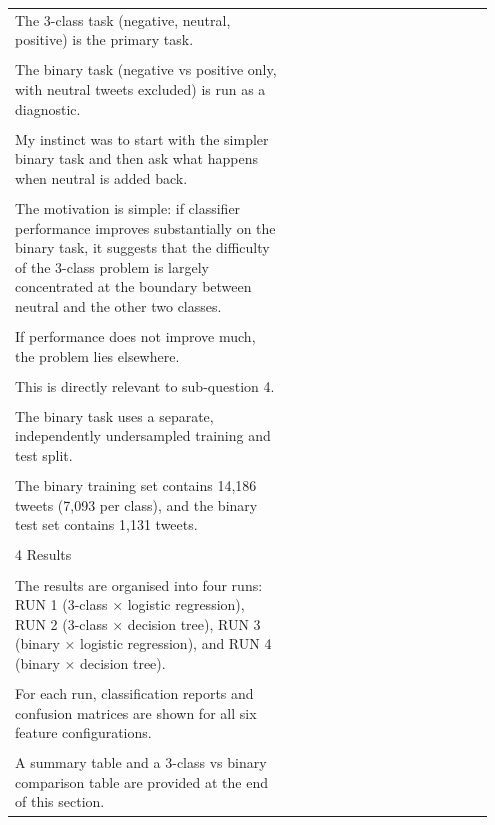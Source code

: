 \documentclass[11pt]{article}
\begin{document}
\begin{longtable}{|p{0.55\linewidth}|p{0.40\linewidth}|}
\hline
\rule{0pt}{3.5cm} & \\
\hline
The 3-class task (negative, neutral, positive) is the primary task. & \\[2pt]
\hline
\rule{0pt}{3.5cm} & \\
\hline
The binary task (negative vs positive only, with neutral tweets excluded) is run as a diagnostic. & \\[2pt]
\hline
\rule{0pt}{3.5cm} & \\
\hline
My instinct was to start with the simpler binary task and then ask what happens when neutral is added back. & \\[2pt]
\hline
\rule{0pt}{3.5cm} & \\
\hline
The motivation is simple: if classifier performance improves substantially on the binary task, it suggests that the difficulty of the 3-class problem is largely concentrated at the boundary between neutral and the other two classes. & \\[2pt]
\hline
\rule{0pt}{3.5cm} & \\
\hline
If performance does not improve much, the problem lies elsewhere. & \\[2pt]
\hline
\rule{0pt}{3.5cm} & \\
\hline
This is directly relevant to sub-question 4. & \\[2pt]
\hline
\rule{0pt}{3.5cm} & \\
\hline
The binary task uses a separate, independently undersampled training and test split. & \\[2pt]
\hline
\rule{0pt}{3.5cm} & \\
\hline
The binary training set contains 14,186 tweets (7,093 per class), and the binary test set contains 1,131 tweets. & \\[2pt]
\hline
\rule{0pt}{3.5cm} & \\
\hline
4 Results & \\[2pt]
\hline
\rule{0pt}{3.5cm} & \\
\hline
The results are organised into four runs: RUN 1 (3-class × logistic regression), RUN 2 (3-class × decision tree), RUN 3 (binary × logistic regression), and RUN 4 (binary × decision tree). & \\[2pt]
\hline
\rule{0pt}{3.5cm} & \\
\hline
For each run, classification reports and confusion matrices are shown for all six feature configurations. & \\[2pt]
\hline
\rule{0pt}{3.5cm} & \\
\hline
A summary table and a 3-class vs binary comparison table are provided at the end of this section. & \\[2pt]

\end{longtable}
\end{document}
